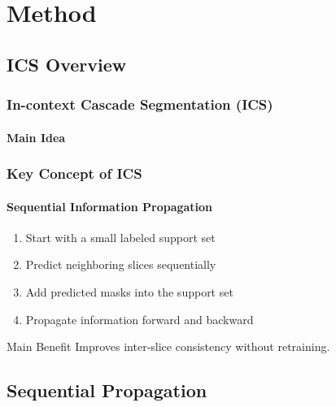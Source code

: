 \documentclass[nometaot,lecture,amberg,autotoc,toc=twocolumn,indicatelastpageofframe,footlinebox]{OTHAWbeamer}
\begin{document}
\section{Method}

\subsection{ICS Overview}

\begin{frame}
    \frametitle{In-context Cascade Segmentation (ICS)}
    \framesubtitle{Main Idea}

    \centering


\end{frame}

\begin{frame}
    \frametitle{Key Concept of ICS}
    \framesubtitle{Sequential Information Propagation}

    \begin{enumerate}
        \item Start with a small labeled support set
        \item Predict neighboring slices sequentially
        \item Add predicted masks into the support set
        \item Propagate information forward and backward
    \end{enumerate}

    \vspace{1em}

    \begin{block}{Main Benefit}
        Improves inter-slice consistency without retraining.
    \end{block}

\end{frame}

\subsection{Sequential Propagation}
\end{document}
